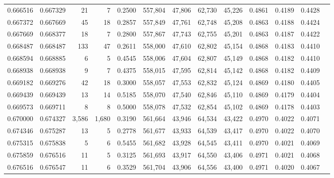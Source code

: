 \begin{tabular}{rrrrrrrrrrrrr}
0.666516 & 0.667329 &     21 &     7 &                                     0.2500 & 557,804 &  47,806 &  62,730 &  45,226 & 0.4861 & 0.4189 & 0.4428 \\
0.667372 & 0.667669 &     45 &    18 &                                     0.2857 & 557,849 &  47,761 &  62,748 &  45,208 & 0.4863 & 0.4188 & 0.4424 \\
0.667669 & 0.668377 &     18 &     7 &                                     0.2800 & 557,867 &  47,743 &  62,755 &  45,201 & 0.4863 & 0.4187 & 0.4422 \\
0.668487 & 0.668487 &    133 &    47 &                                     0.2611 & 558,000 &  47,610 &  62,802 &  45,154 & 0.4868 & 0.4183 & 0.4410 \\
0.668594 & 0.668885 &      6 &     5 &                                     0.4545 & 558,006 &  47,604 &  62,807 &  45,149 & 0.4868 & 0.4182 & 0.4410 \\
0.668938 & 0.668938 &      9 &     7 &                                     0.4375 & 558,015 &  47,595 &  62,814 &  45,142 & 0.4868 & 0.4182 & 0.4409 \\
0.669182 & 0.669276 &     42 &    18 &                                     0.3000 & 558,057 &  47,553 &  62,832 &  45,124 & 0.4869 & 0.4180 & 0.4405 \\
0.669439 & 0.669439 &     13 &    14 &                                     0.5185 & 558,070 &  47,540 &  62,846 &  45,110 & 0.4869 & 0.4179 & 0.4404 \\
0.669573 & 0.669711 &      8 &     8 &                                     0.5000 & 558,078 &  47,532 &  62,854 &  45,102 & 0.4869 & 0.4178 & 0.4403 \\
0.670000 & 0.674327 &  3,586 & 1,680 &                                     0.3190 & 561,664 &  43,946 &  64,534 &  43,422 & 0.4970 & 0.4022 & 0.4071 \\
0.674346 & 0.675287 &     13 &     5 &                                     0.2778 & 561,677 &  43,933 &  64,539 &  43,417 & 0.4970 & 0.4022 & 0.4070 \\
0.675315 & 0.675838 &      5 &     6 &                                     0.5455 & 561,682 &  43,928 &  64,545 &  43,411 & 0.4970 & 0.4021 & 0.4069 \\
0.675859 & 0.676516 &     11 &     5 &                                     0.3125 & 561,693 &  43,917 &  64,550 &  43,406 & 0.4971 & 0.4021 & 0.4068 \\
0.676516 & 0.676547 &     11 &     6 &                                     0.3529 & 561,704 &  43,906 &  64,556 &  43,400 & 0.4971 & 0.4020 & 0.4067 \\

\end{tabular}
